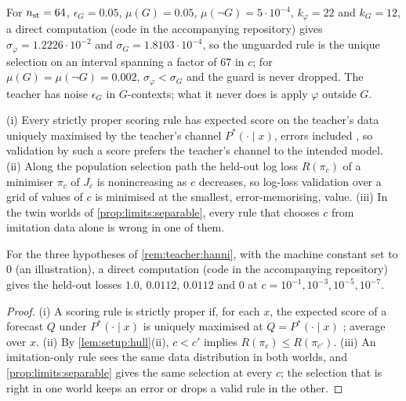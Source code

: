 For $n_{\rm st}=64$, $\epsilon_G=0.05$, $\mu(G)=0.05$, $\mu(\neg G)=5\cdot10^{-4}$, $k_\varphi=22$ and $k_G=12$, a direct computation (code in the accompanying repository) gives $\sigma_\varphi=1.2226\cdot10^{-2}$ and $\sigma_G=1.8103\cdot10^{-4}$, so the unguarded rule is the unique selection on an interval spanning a factor of $67$ in $c$; for $\mu(G)=\mu(\neg G)=0.002$, $\sigma_\varphi<\sigma_G$ and the guard is never dropped. The teacher has noise $\epsilon_G$ in $G$-contexts; what it never does is apply $\varphi$ outside $G$.

\begin{proposition}\label{prop:limits:noident}
(i) Every strictly proper scoring rule has expected score on the teacher's data uniquely maximised by the teacher's channel $P^*(\cdot\mid x)$, errors included \citep{gneiting2007strictly}, so validation by such a score prefers the teacher's channel to the intended model. (ii) Along the population selection path the held-out log loss $R(\pi_c)$ of a minimiser $\pi_c$ of $J_c$ is nonincreasing as $c$ decreases, so log-loss validation over a grid of values of $c$ is minimised at the smallest, error-memorising, value. (iii) In the twin worlds of \cref{prop:limits:separable}, every rule that chooses $c$ from imitation data alone is wrong in one of them.
\end{proposition}

For the three hypotheses of \cref{rem:teacher:hanni}, with the machine constant set to $0$ (an illustration), a direct computation (code in the accompanying repository) gives the held-out losses $1.0$, $0.0112$, $0.0112$ and $0$ at $c=10^{-1},10^{-3},10^{-5},10^{-7}$.

\begin{proof}
(i) A scoring rule is strictly proper if, for each $x$, the expected score of a forecast $Q$ under $P^*(\cdot\mid x)$ is uniquely maximised at $Q=P^*(\cdot\mid x)$ \citep{gneiting2007strictly}; average over $x$. (ii) By \cref{lem:setup:hull}(ii), $c<c'$ implies $R(\pi_c)\le R(\pi_{c'})$. (iii) An imitation-only rule sees the same data distribution in both worlds, and \cref{prop:limits:separable} gives the same selection at every $c$; the selection that is right in one world keeps an error or drops a valid rule in the other.
\end{proof}

